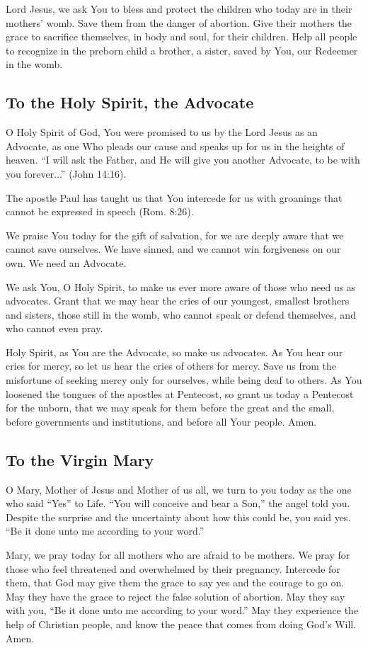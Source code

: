 \documentclass[12pt]{article}
\newcommand{\prayertitle}[1]{\subsection{#1}}
\begin{document}
Lord Jesus, we ask You to bless and protect the children who today are in their mothers' womb.
Save them from the danger of abortion.
Give their mothers the grace to sacrifice themselves, in body and soul, for their children.
Help all people to recognize in the preborn child a brother, a sister, saved by You, our Redeemer in the womb.

\prayertitle{To the Holy Spirit, the Advocate}
O Holy Spirit of God, You were promised to us by the Lord Jesus as an Advocate, as one Who pleads our cause and speaks up for us in the heights of heaven.
``I will ask the Father, and He will give you another Advocate, to be with you forever...'' (John 14:16).

The apostle Paul has taught us that You intercede for us with groanings that cannot be expressed in speech (Rom. 8:26).

We praise You today for the gift of salvation, for we are deeply aware that we cannot save ourselves.
We have sinned, and we cannot win forgiveness on our own.
We need an Advocate.

We ask You, O Holy Spirit, to make us ever more aware of those who need us as advocates.
Grant that we may hear the cries of our youngest, smallest brothers and sisters, those still in the womb, who cannot speak or defend themselves, and who cannot even pray.

Holy Spirit, as You are the Advocate, so make us advocates.
As You hear our cries for mercy, so let us hear the cries of others for mercy.
Save us from the misfortune of seeking mercy only for ourselves, while being deaf to others.
As You loosened the tongues of the apostles at Pentecost, so grant us today a Pentecost for the unborn, that we may speak for them before the great and the small, before governments and institutions, and before all Your people.
Amen.

\prayertitle{To the Virgin Mary}
O Mary, Mother of Jesus and Mother of us all, we turn to you today as the one who said ``Yes'' to Life.
``You will conceive and bear a Son,'' the angel told you.
Despite the surprise and the uncertainty about how this could be, you said yes.
``Be it done unto me according to your word.''

Mary, we pray today for all mothers who are afraid to be mothers.
We pray for those who feel threatened and overwhelmed by their pregnancy.
Intercede for them, that God may give them the grace to say yes and the courage to go on.
May they have the grace to reject the false solution of abortion.
May they say with you, ``Be it done unto me according to your word.''
May they experience the help of Christian people, and know the peace that comes from doing God's Will.
Amen.
\end{document}
